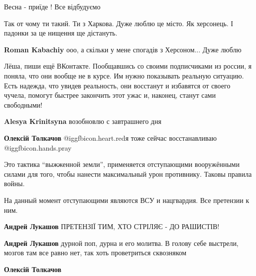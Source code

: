  
 
 
 
 
\zzSecCmt

\begin{itemize} %
Весна - приїде !
Все відбудуємо

Так от чому ти такий. Ти з Харкова. Дуже люблю це місто. Як херсонець. І падонки за це нищення ще дістануть.

\textbf{Roman Kabachiy} ооо, а скільки у мене спогадів з Херсоном... Дуже люблю


Лёша, пиши ещё ВКонтакте. Пообщавшись со своими подписчиками из россии, я
поняла, что они вообще не в курсе. Им нужно показывать реальную ситуацию. Есть
надежда, что увидев реальность, они восстанут и избавятся от своего чучела,
помогут быстрее закончить этот ужас и, наконец, станут сами свободными!

\begin{itemize} %
\textbf{Alesya Krinitsyna} возобновлю с завтрашнего дня

\textbf{Олексій Толкачов} @igg{fbicon.heart.red}я тоже сейчас восстанавливаю @igg{fbicon.hands.pray} 
\end{itemize} %


Это тактика \enquote{выжженной земли}, применяется отступающими вооружёнными силами для
того, чтобы нанести максимальный урон противнику. Таковы правила войны.

На данный момент отступающими являются ВСУ и нацгвардия. Все претензии к ним.

\begin{itemize} %
\textbf{Андрей Лукашов} ПРЕТЕНЗІЇ ТИМ, ХТО СТРІЛЯЄ - ДО РАШИСТІВ!

\textbf{Андрей Лукашов} дурной поп, дурна и его молитва.
В голову себе выстрели, мозгов там все равно нет, так хоть проветриться сквозняком

\textbf{Олексій Толкачов} 


\end{itemize}
\end{itemize}
